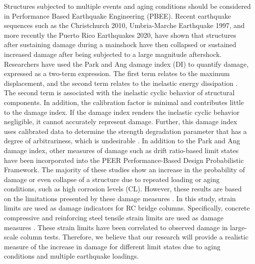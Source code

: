Structures subjected to multiple events and aging conditions should be considered in Performance Based Earthquake Engineering (PBEE). Recent earthquake sequences such as the Christchurch 2010, Umbria-Marche Earthquake 1997, and more recently the Puerto Rico Earthquakes 2020, have shown that structures after sustaining damage during a mainshock have then collapsed or sustained increased damage after being subjected to a large magnitude aftershock\cite{Amato1998}\cite{Bradley}\cite{Miranda2020}. Researchers have used the Park and Ang damage index (DI) to quantify damage, expressed as a two-term expression. The first term relates to the maximum displacement, and the second term relates to the inelastic energy dissipation \cite{Young-JiPark1985}. The second term is associated with the inelastic cyclic behavior of structural components. In addition, the calibration factor is minimal and contributes little to the damage index. If the damage index renders the inelastic cyclic behavior negligible, it cannot accurately represent damage.
Further, this damage index uses calibrated data to determine the strength degradation parameter that has a degree of arbitrariness, which is undesirable \cite{Williams1995}. In addition to the Park and Ang damage index, other measures of damage such as drift ratio-based limit states have been incorporated into the PEER Performance-Based Design Probabilistic Framework\cite{Padgett2007}\cite{Ghosh2015}\cite{Shekhar2018}. The majority of these studies show an increase in the probability of damage or even collapse of a structure due to repeated loading or aging conditions, such as high corrosion levels (CL). However, these results are based on the limitations presented by these damage measures \cite{Shekhar2018}. In this study, strain limits are used as damage indicators for RC bridge columns. Specifically, concrete compressive and reinforcing steel tensile strain limits are used as damage measures \cite{Goodnight2016}. These strain limits have been correlated to observed damage in large-scale column tests. Therefore, we believe that our research will provide a realistic measure of the increase in damage for different limit states due to aging conditions and multiple earthquake loadings. 


